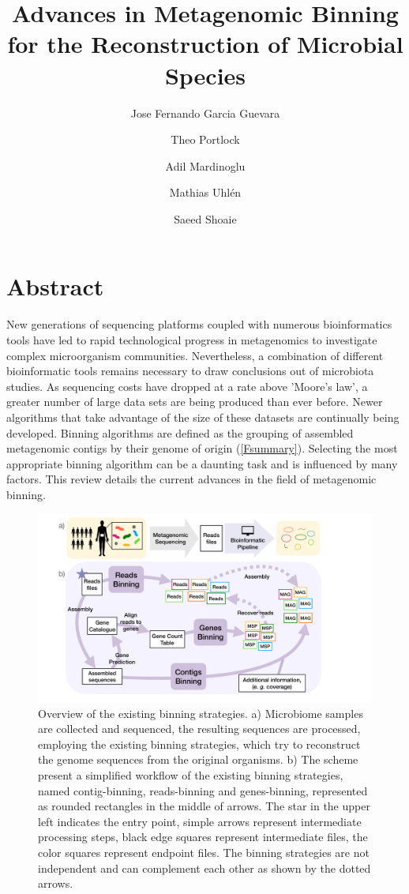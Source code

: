 \documentclass{article}
\title{Advances in Metagenomic Binning for the Reconstruction of Microbial Species}
\author[1*]{Jose Fernando Garcia Guevara}
\author[1*]{Theo Portlock}
\author[1,2]{Adil Mardinoglu}
\author[1]{Mathias Uhlén}
\author[1,2]{Saeed Shoaie}
\affil[1]{Science for Life Laboratory, Royal Institute of Technology (KTH), Stockholm, Sweden.}
\affil[2]{Centre for Host Microbiome Interactions, Faculty of Dentistry, Oral \& Craniofacial Sciences, King’s College London, London, UK. }
\date{}
\begin{document}
\maketitle
\tableofcontents

\printglossaries

\section{Abstract}
New generations of sequencing platforms coupled with numerous bioinformatics tools have led to rapid technological progress in metagenomics to investigate complex microorganism communities.
Nevertheless, a combination of different bioinformatic tools remains necessary to draw conclusions out of microbiota studies.
As sequencing costs have dropped at a rate above 'Moore's law', a greater number of large data sets are being produced than ever before.
Newer algorithms that take advantage of the size of these datasets are continually being developed.
Binning algorithms are defined as the grouping of assembled metagenomic contigs by their genome of origin (\autoref{Fsummary}).
Selecting the most appropriate binning algorithm can be a daunting task and is influenced by many factors.
This review details the current advances in the field of metagenomic binning.

\begin{figure}
\centering
\includegraphics[scale=0.24]{figures/figure_binning_software.001.pdf}
\caption["Overview of the existing binning strategies."]{
	Overview of the existing binning strategies. a) Microbiome samples are collected and sequenced, the resulting sequences are processed, employing the existing binning strategies, which try to reconstruct the genome sequences from the original organisms. b) The scheme present a simplified workflow of the existing binning strategies, named contig-binning, reads-binning and genes-binning, represented as rounded rectangles in the middle of arrows. The star in the upper left indicates the entry point, simple arrows represent intermediate processing steps, black edge squares represent intermediate files, the color squares represent endpoint files. The binning strategies are not independent and can complement each other as shown by the dotted arrows.}
\label{Fsummary}
\end{figure}
\end{document}
